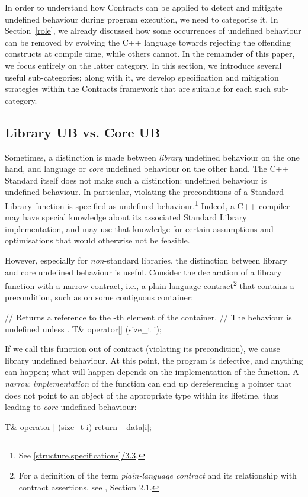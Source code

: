 In order to understand how Contracts can be applied to detect and mitigate undefined behaviour during program execution, we need to categorise it. In Section~\ref{role}, we already discussed how some occurrences of undefined behaviour can be removed by evolving the C++ language towards rejecting the offending constructs at compile time, while others cannot. In the remainder of this paper, we focus entirely on the latter category. In this section, we introduce several useful sub-categories; along with it, we develop specification and mitigation strategies within the Contracts framework that are suitable for each such sub-category.
	
\subsection{Library UB vs. Core UB}

Sometimes, a distinction is made between \emph{library} undefined behaviour on the one hand, and language or \emph{core} undefined behaviour on the other hand. The C++ Standard itself does not make such a distinction: undefined behaviour is undefined behaviour. In particular, violating the preconditions of a Standard Library function is specified as undefined behaviour.\footnote{See \href{https://timsong-cpp.github.io/cppwp/n4950/library\#structure.specifications-3.3}{[structure.specifications]/3.3}.} Indeed, a C++ compiler may have special knowledge about its associated Standard Library implementation, and may use that knowledge for certain assumptions and optimisations that would otherwise not be feasible.

However, especially for \emph{non}-standard libraries, the distinction between library and core undefined behaviour is useful. Consider the declaration of a library function with a narrow contract, i.e., a plain-language contract\footnote{For a definition of the term \emph{plain-language contract} and its relationship with contract assertions, see \cite{P2900R9}, Section 2.1.} that contains a precondition, such as  on some contiguous container:
\begin{codeblock}
// Returns a reference to the -th element of the container.
// The behaviour is undefined unless .
T& operator[] (size_t i);
\end{codeblock}
If we call this function out of contract (violating its precondition), we cause library undefined behaviour. At this point, the program is defective, and anything can happen; what will happen depends on the implementation of the function. A \emph{narrow implementation} of the function can end up dereferencing a pointer that does not point to an object of the appropriate type within its lifetime, thus leading to \emph{core} undefined behaviour:
\begin{codeblock}
T& operator[] (size_t i) {
  return _data[i];
}
\end{codeblock}

